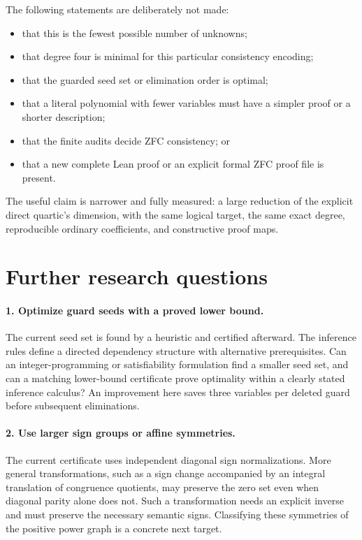 \documentclass[11pt,letterpaper]{article}
\theoremstyle{definition}
\begin{document}
The following statements are deliberately not made:
\begin{itemize}
\item that this is the fewest possible number of unknowns;
\item that degree four is minimal for this particular consistency
    encoding;
\item that the guarded seed set or elimination order is optimal;
\item that a literal polynomial with fewer variables must have a
    simpler proof or a shorter description;
\item that the finite audits decide ZFC consistency; or
\item that a new complete Lean proof or an explicit formal ZFC proof
    file is present.
\end{itemize}
The useful claim is narrower and fully measured: a large reduction of
the explicit direct quartic's dimension, with the same logical target,
the same exact degree, reproducible ordinary coefficients, and
constructive proof maps.

\section{Further research questions}
\label{sec:future}

\paragraph{1. Optimize guard seeds with a proved lower bound.}
The current seed set is found by a heuristic and certified afterward.
The inference rules define a directed dependency structure with
alternative prerequisites. Can an integer-programming or satisfiability
formulation find a smaller seed set, and can a matching lower-bound
certificate prove optimality within a clearly stated inference calculus?
An improvement here saves three variables per deleted guard before
subsequent eliminations.

\paragraph{2. Use larger sign groups or affine symmetries.}
The current certificate uses independent diagonal sign normalizations.
More general transformations, such as a sign change accompanied by an
integral translation of congruence quotients, may preserve the zero set
even when diagonal parity alone does not. Such a transformation needs
an explicit inverse and must preserve the necessary semantic signs.
Classifying these symmetries of the positive power graph is a concrete
next target.
\end{document}

